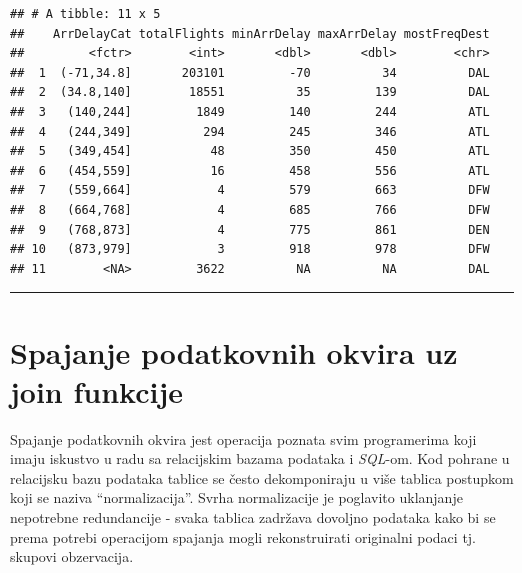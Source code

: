 \documentclass[]{book}
\newenvironment{Shaded}{\begin{snugshade}}{\end{snugshade}}
\newcommand{\KeywordTok}[1]{\textcolor[rgb]{0.13,0.29,0.53}{\textbf{#1}}}
\newcommand{\DataTypeTok}[1]{\textcolor[rgb]{0.13,0.29,0.53}{#1}}
\newcommand{\DecValTok}[1]{\textcolor[rgb]{0.00,0.00,0.81}{#1}}
\newcommand{\StringTok}[1]{\textcolor[rgb]{0.31,0.60,0.02}{#1}}
\newcommand{\CommentTok}[1]{\textcolor[rgb]{0.56,0.35,0.01}{\textit{#1}}}
\newcommand{\OperatorTok}[1]{\textcolor[rgb]{0.81,0.36,0.00}{\textbf{#1}}}
\newcommand{\NormalTok}[1]{#1}
\theoremstyle{definition}
\theoremstyle{definition}
\theoremstyle{definition}
\theoremstyle{remark}
\begin{document}
\begin{Shaded}
\end{Shaded}

\begin{verbatim}
## # A tibble: 11 x 5
##    ArrDelayCat totalFlights minArrDelay maxArrDelay mostFreqDest
##         <fctr>        <int>       <dbl>       <dbl>        <chr>
##  1  (-71,34.8]       203101         -70          34          DAL
##  2  (34.8,140]        18551          35         139          DAL
##  3   (140,244]         1849         140         244          ATL
##  4   (244,349]          294         245         346          ATL
##  5   (349,454]           48         350         450          ATL
##  6   (454,559]           16         458         556          ATL
##  7   (559,664]            4         579         663          DFW
##  8   (664,768]            4         685         766          DFW
##  9   (768,873]            4         775         861          DEN
## 10   (873,979]            3         918         978          DFW
## 11        <NA>         3622          NA          NA          DAL
\end{verbatim}

\begin{center}\rule{0.5\linewidth}{\linethickness}\end{center}

\section{Spajanje podatkovnih okvira uz join
funkcije}\label{spajanje-podatkovnih-okvira-uz-join-funkcije}

Spajanje podatkovnih okvira jest operacija poznata svim programerima
koji imaju iskustvo u radu sa relacijskim bazama podataka i
\emph{SQL}-om. Kod pohrane u relacijsku bazu podataka tablice se često
dekomponiraju u više tablica postupkom koji se naziva ``normalizacija''.
Svrha normalizacije je poglavito uklanjanje nepotrebne redundancije -
svaka tablica zadržava dovoljno podataka kako bi se prema potrebi
operacijom spajanja mogli rekonstruirati originalni podaci tj. skupovi
obzervacija.
\end{document}
